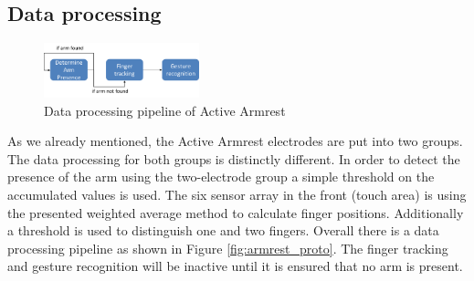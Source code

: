 \subsection{Data processing}
\begin{figure}[h]
\centering
\includegraphics[width=0.4\textwidth]{images/armrest_dataproc}
\caption{Data processing pipeline of Active Armrest}
\label{fig:armrest_dataproc}
\end{figure}
As we already mentioned, the Active Armrest electrodes are put into two groups. The data processing for both groups is distinctly different. In order to detect the presence of the arm using the two-electrode group a simple threshold on the accumulated values is used. The six sensor array in the front (touch area) is using the presented weighted average method to calculate finger positions. Additionally a threshold is used to distinguish one and two fingers. Overall there is a data processing pipeline as shown in Figure \ref{fig:armrest_proto}. The finger tracking and gesture recognition will be inactive until it is ensured that no arm is present. 

